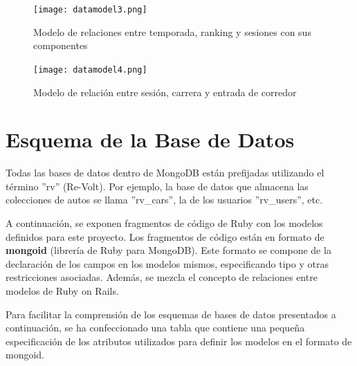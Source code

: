 \begin{figure}[H]
  \begin{center}
    \texttt{[image: datamodel3.png]}
  \end{center}
  \caption[Modelo de relaciones entre temporada, ranking y sesiones con sus componentes]{Modelo de relaciones entre temporada, ranking y sesiones con sus componentes}
  \label{fig:datamodels3}
\end{figure}

\begin{figure}[H]
  \begin{center}
    \texttt{[image: datamodel4.png]}
  \end{center}
  \caption[Modelo de relación entre sesión, carrera y entrada de corredor]{Modelo de relación entre sesión, carrera y entrada de corredor}
  \label{fig:datamodels4}
\end{figure}

\newpage

\section{Esquema de la Base de Datos}
Todas las bases de datos dentro de MongoDB están prefijadas utilizando el término ''rv'' (Re-Volt). Por ejemplo, la base de datos que almacena las colecciones de autos se llama ''rv\_cars'', la de los usuarios ''rv\_users'', etc.

A continuación, se exponen fragmentos de código de Ruby con los modelos definidos para este proyecto. Los fragmentos de código están en formato de \textbf{mongoid} (librería de Ruby para MongoDB). Este formato se compone de la declaración de los campos en los modelos mismos, especificando tipo y otras restricciones asociadas. Además, se mezcla el concepto de relaciones entre modelos de Ruby on Rails.

Para facilitar la comprensión de los esquemas de bases de datos presentados a continuación, se ha confeccionado una tabla que contiene una pequeña especificación de los atributos utilizados para definir los modelos en el formato de mongoid.


